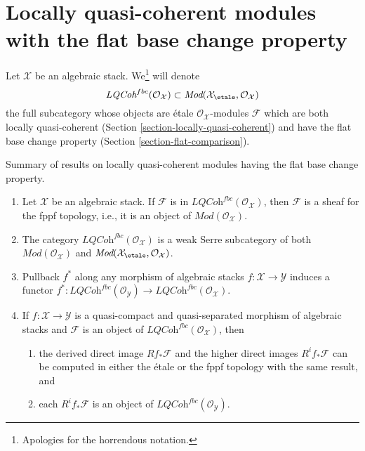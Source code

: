 \section{Locally quasi-coherent modules with the flat base change property}
\label{section-loc-qcoh-flat-base-change}

\noindent
Let $\mathcal{X}$ be an algebraic stack. We\footnote{Apologies
for the horrendous notation.} will denote
$$
\textit{LQCoh}^{fbc}(\mathcal{O}_\mathcal{X})
\subset
\textit{Mod}(\mathcal{X}_\etale, \mathcal{O}_\mathcal{X})
$$
the full subcategory whose objects are \'etale
$\mathcal{O}_\mathcal{X}$-modules $\mathcal{F}$
which are both locally quasi-coherent
(Section \ref{section-locally-quasi-coherent})
and have the flat base change property
(Section \ref{section-flat-comparison}).

\begin{proposition}
\label{proposition-loc-qcoh-flat-base-change}
Summary of results on locally quasi-coherent modules having the flat
base change property.
\begin{enumerate}
\item Let $\mathcal{X}$ be an algebraic stack.
If $\mathcal{F}$ is in $\textit{LQCoh}^{fbc}(\mathcal{O}_\mathcal{X})$,
then $\mathcal{F}$ is a sheaf for the fppf topology, i.e., it is
an object of $\textit{Mod}(\mathcal{O}_\mathcal{X})$.
\item The category $\textit{LQCoh}^{fbc}(\mathcal{O}_\mathcal{X})$
is a weak Serre subcategory of both $\textit{Mod}(\mathcal{O}_\mathcal{X})$
and $\textit{Mod}(\mathcal{X}_\etale, \mathcal{O}_\mathcal{X})$.
\item Pullback $f^*$ along any morphism of algebraic stacks
$f : \mathcal{X} \to \mathcal{Y}$ induces a functor
$f^* : \textit{LQCoh}^{fbc}(\mathcal{O}_\mathcal{Y}) \to
\textit{LQCoh}^{fbc}(\mathcal{O}_\mathcal{X})$.
\item If $f : \mathcal{X} \to \mathcal{Y}$ is a
quasi-compact and quasi-separated morphism of algebraic stacks
and $\mathcal{F}$ is an object of
$\textit{LQCoh}^{fbc}(\mathcal{O}_\mathcal{X})$, then
\begin{enumerate}
\item the derived direct image $Rf_*\mathcal{F}$ and the higher direct
images $R^if_*\mathcal{F}$ can be computed in either the \'etale or the
fppf topology with the same result, and
\item each $R^if_*\mathcal{F}$ is an object of
$\textit{LQCoh}^{fbc}(\mathcal{O}_\mathcal{Y})$.
\end{enumerate}

\end{enumerate}
\end{proposition}

